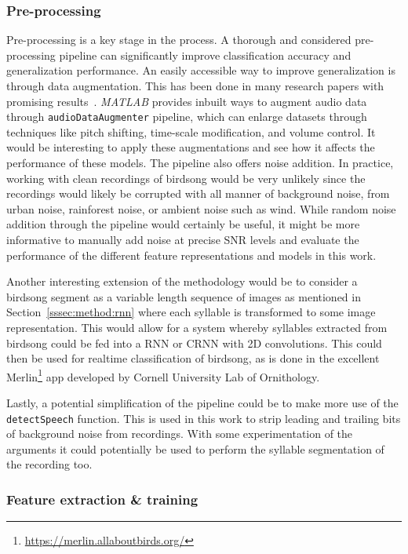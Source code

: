 \subsubsection{Pre-processing}

Pre-processing is a key stage in the process. A thorough and considered
pre-processing pipeline can significantly improve classification accuracy and
generalization performance. An easily accessible way to improve generalization
is through data augmentation. This has been done in many research papers with
promising results~\cite{kahl2017large}. \textit{MATLAB} provides inbuilt ways to
augment audio data through \texttt{audioDataAugmenter} pipeline, which can
enlarge datasets through techniques like pitch shifting, time-scale
modification, and volume control. It would be interesting to apply these
augmentations and see how it affects the performance of these models. The
pipeline also offers noise addition. In practice, working with clean recordings
of birdsong would be very unlikely since the recordings would likely be
corrupted with all manner of background noise, from urban noise, rainforest
noise, or ambient noise such as wind. While random noise addition through the
pipeline would certainly be useful, it might be more informative to manually add
noise at precise SNR levels and evaluate the performance of the different
feature representations and models in this work.

Another interesting extension of the methodology would be to consider a birdsong
segment as a variable length sequence of images as mentioned in
Section~\ref{sssec:method:rnn} where each syllable is transformed to some image
representation. This would allow for a system whereby syllables extracted from
birdsong could be fed into a RNN or CRNN with 2D convolutions. This could then
be used for realtime classification of birdsong, as is done in the excellent
Merlin\footnote{\url{https://merlin.allaboutbirds.org/}} app developed by
Cornell University Lab of Ornithology.

Lastly, a potential simplification of the pipeline could be to make more use of
the \texttt{detectSpeech} function. This is used in this work to strip leading
and trailing bits of background noise from recordings. With some experimentation
of the arguments it could potentially be used to perform the syllable
segmentation of the recording too.

\subsubsection{Feature extraction \& training}

